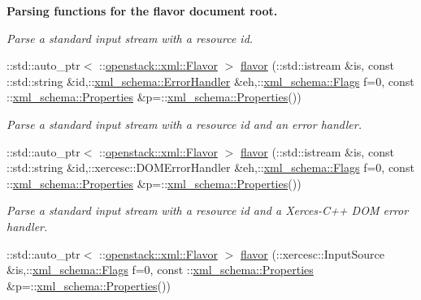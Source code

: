 \begin{Indent}{\bf Parsing functions for the flavor document root.}
\begin{DoxyCompactItemize}
\begin{DoxyCompactList}\small\item\em Parse a standard input stream with a resource id. \item\end{DoxyCompactList}\item 
::std::auto\_\-ptr$<$ ::\hyperlink{classopenstack_1_1xml_1_1Flavor}{openstack::xml::Flavor} $>$ \hyperlink{namespaceopenstack_1_1xml_ad143fa7ef93334c27176bc867913ead0}{flavor} (::std::istream \&is, const ::std::string \&id,::\hyperlink{namespacexml__schema_ab1c9361bfd3b404eaabf0c31eded79dc}{xml\_\-schema::ErrorHandler} \&eh,::\hyperlink{namespacexml__schema_affb4c227cbd9aa7453dd1dc5a1401943}{xml\_\-schema::Flags} f=0, const ::\hyperlink{namespacexml__schema_ad27ce19a7ee1d3b1064092648898f64c}{xml\_\-schema::Properties} \&p=::\hyperlink{namespacexml__schema_ad27ce19a7ee1d3b1064092648898f64c}{xml\_\-schema::Properties}())
\begin{DoxyCompactList}\small\item\em Parse a standard input stream with a resource id and an error handler. \item\end{DoxyCompactList}\item 
::std::auto\_\-ptr$<$ ::\hyperlink{classopenstack_1_1xml_1_1Flavor}{openstack::xml::Flavor} $>$ \hyperlink{namespaceopenstack_1_1xml_a2944680b066fcd2f4783a21c609ec9c1}{flavor} (::std::istream \&is, const ::std::string \&id,::xercesc::DOMErrorHandler \&eh,::\hyperlink{namespacexml__schema_affb4c227cbd9aa7453dd1dc5a1401943}{xml\_\-schema::Flags} f=0, const ::\hyperlink{namespacexml__schema_ad27ce19a7ee1d3b1064092648898f64c}{xml\_\-schema::Properties} \&p=::\hyperlink{namespacexml__schema_ad27ce19a7ee1d3b1064092648898f64c}{xml\_\-schema::Properties}())
\begin{DoxyCompactList}\small\item\em Parse a standard input stream with a resource id and a Xerces-\/C++ DOM error handler. \item\end{DoxyCompactList}\item 
::std::auto\_\-ptr$<$ ::\hyperlink{classopenstack_1_1xml_1_1Flavor}{openstack::xml::Flavor} $>$ \hyperlink{namespaceopenstack_1_1xml_a6877530325a52821fdfe8af52f6af674}{flavor} (::xercesc::InputSource \&is,::\hyperlink{namespacexml__schema_affb4c227cbd9aa7453dd1dc5a1401943}{xml\_\-schema::Flags} f=0, const ::\hyperlink{namespacexml__schema_ad27ce19a7ee1d3b1064092648898f64c}{xml\_\-schema::Properties} \&p=::\hyperlink{namespacexml__schema_ad27ce19a7ee1d3b1064092648898f64c}{xml\_\-schema::Properties}())

\end{DoxyCompactItemize}
\end{Indent}
